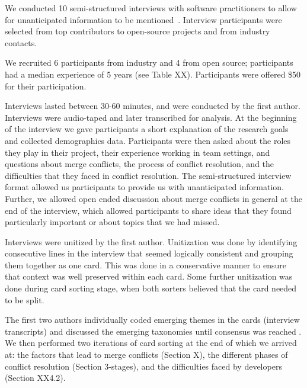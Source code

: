 We conducted 10 semi-structured interviews with software practitioners to allow for unanticipated information to be mentioned~\cite{seaman2008qualitative}.
Interview participants were selected from top contributors to open-source projects and from industry contacts.

We recruited 6 participants from industry and 4 from open source; participants had a median experience of 5 years (see Table XX). Participants were offered \$50 for their participation.  

Interviews lasted between 30-60 minutes, and were conducted by the first author. Interviews were audio-taped and later transcribed for analysis. At the beginning of the interview we gave participants a short explanation of the research goals and collected demographics data. Participants were then asked about the roles they play in their project, their experience working in team settings, and questions about merge conflicts, the process of conflict resolution, and the difficulties that they faced in conflict resolution. The semi-structured interview format allowed us participants to provide us with unanticipated information. Further, we allowed open ended discussion about merge conflicts in general at the end of the interview, which allowed participants to share ideas that they found particularly important or about topics that we had missed. 


Interviews were unitized \cite{unitization} by the first author. Unitization was done by identifying consecutive lines in the interview that seemed logically consistent and grouping them together as one card. This was done in a conservative manner to ensure that context was well preserved within each card. Some further unitization was done during card sorting stage, when both sorters believed that the card needed to be split.


The first two authors individually coded emerging themes in the cards (interview transcripts) and discussed the emerging taxonomies until consensus was reached \cite{card_sort}. We then performed two iterations of card sorting at the end of which we arrived at: the factors that lead to merge conflicts (Section X), the different phases of conflict resolution (Section 3-stages), and the difficulties faced by developers (Section XX4.2).

